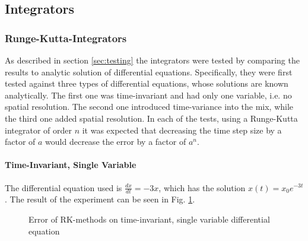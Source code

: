 \subsection{Integrators}
\subsubsection{Runge-Kutta-Integrators}
As described in section \ref{sec:testing} the integrators were tested by comparing the results to analytic solution of differential equations.
Specifically, they were first tested against three types of differential equations, whose solutions are known analytically.
The first one was time-invariant and had only one variable, i.e. no spatial resolution.
The second one introduced time-variance into the mix, while the third one added spatial resolution.
In each of the tests, using a Runge-Kutta integrator of order $n$ it was expected that decreasing the time step size by a factor of $a$ would decrease the error by a factor of $a^n$.\\
\paragraph*{Time-Invariant, Single Variable}
The differential equation used is $\frac{dx}{dt}=-3x$, which has the solution $x(t)=x_0e^{-3t}$.
The result of the experiment can be seen in Fig. \ref{fig:RK_error_y'=-3y}.
\begin{figure}[!h]
    \caption{Error of RK-methods on time-invariant, single variable differential equation}
    \label{fig:RK_error_y'=-3y}
\end{figure}

